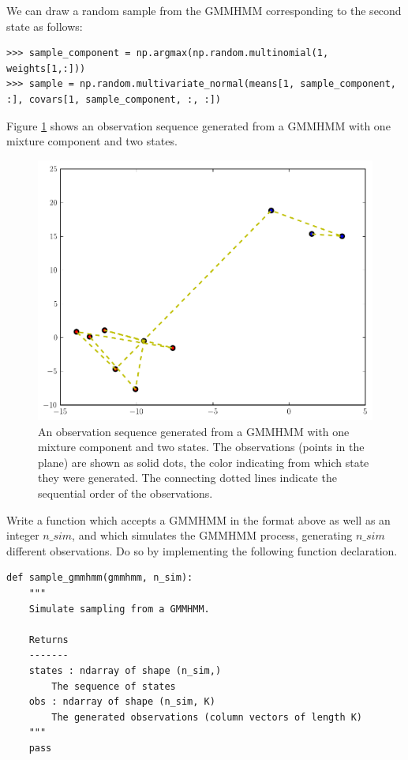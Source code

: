 We can draw a random sample from the GMMHMM corresponding to the second state as follows:
\begin{lstlisting}
>>> sample_component = np.argmax(np.random.multinomial(1, weights[1,:]))
>>> sample = np.random.multivariate_normal(means[1, sample_component, :], covars[1, sample_component, :, :])
\end{lstlisting}

Figure \ref{fig:samples} shows an observation sequence generated from a GMMHMM with one mixture component and two states.

\begin{figure}
\centering
\includegraphics[width=\textwidth]{samples}
\caption{An observation sequence generated from a GMMHMM with one mixture component and two states.
The observations (points in the plane) are shown as solid dots, the color indicating from which
state they were generated. The connecting dotted lines indicate the sequential order of the observations.}
\label{fig:samples}
\end{figure}

\begin{problem}
Write a function which accepts a GMMHMM in the format above as well as an integer $n\_sim$, and which simulates the GMMHMM process, generating $n\_sim$ different observations.
Do so by implementing the following function declaration.
\begin{lstlisting}
def sample_gmmhmm(gmmhmm, n_sim):
    """
    Simulate sampling from a GMMHMM.

    Returns
    -------
    states : ndarray of shape (n_sim,)
        The sequence of states
    obs : ndarray of shape (n_sim, K)
        The generated observations (column vectors of length K)
    """
    pass
\end{lstlisting}
\end{problem}

